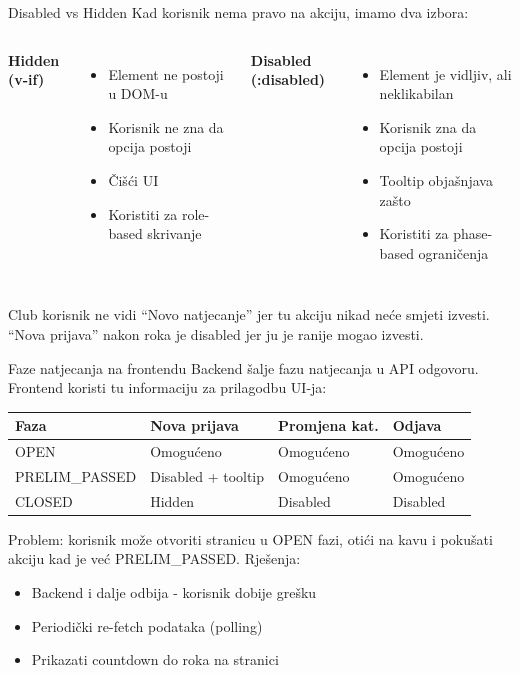 \begin{frame}{Disabled vs Hidden}
Kad korisnik nema pravo na akciju, imamo dva izbora:

\vspace{0.4em}
\begin{columns}[T]
\textbf{Hidden (v-if)}
\begin{itemize}
  \item Element ne postoji u DOM-u
  \item Korisnik ne zna da opcija postoji
  \item Čišći UI
  \item Koristiti za role-based skrivanje
\end{itemize}

\textbf{Disabled (:disabled)}
\begin{itemize}
  \item Element je vidljiv, ali neklikabilan
  \item Korisnik zna da opcija postoji
  \item Tooltip objašnjava zašto
  \item Koristiti za phase-based ograničenja
\end{itemize}
\end{columns}

\vspace{0.6em}
Club korisnik ne vidi \enquote{Novo natjecanje} jer tu akciju nikad neće smjeti izvesti. \enquote{Nova prijava} nakon roka je disabled jer ju je ranije mogao izvesti.
\end{frame}

\begin{frame}{Faze natjecanja na frontendu}
Backend šalje fazu natjecanja u API odgovoru. Frontend koristi tu informaciju za prilagodbu UI-ja:

\vspace{0.4em}
\begin{tabular}{@{}llll@{}}
  \toprule
  \textbf{Faza} & \textbf{Nova prijava} & \textbf{Promjena kat.} & \textbf{Odjava} \\
  \midrule
  OPEN & Omogućeno & Omogućeno & Omogućeno \\
  PRELIM\_PASSED & Disabled + tooltip & Omogućeno & Omogućeno \\
  CLOSED & Hidden & Disabled & Disabled \\
  \bottomrule
\end{tabular}

\vspace{0.6em}
Problem: korisnik može otvoriti stranicu u OPEN fazi, otići na kavu i pokušati akciju kad je već PRELIM\_PASSED. Rješenja:
\begin{itemize}
  \item Backend i dalje odbija - korisnik dobije grešku
  \item Periodički re-fetch podataka (polling)
  \item Prikazati countdown do roka na stranici
\end{itemize}
\end{frame}

